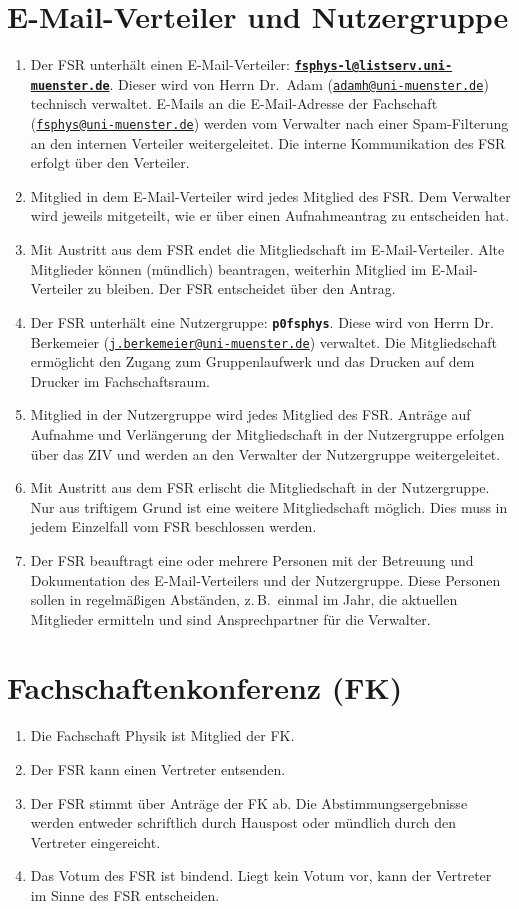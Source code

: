 \documentclass[
	a4paper,
	12pt,
	oneside,
	parskip=half-,
	pagesize,
	headsepline,
	german,
	ngerman
]{scrartcl}
\newcommand{\email}[1]{\href{mailto:#1}{\texttt{#1}}}
\begin{document}
\section{E-Mail-Verteiler und Nutzergruppe}
\label{sec:Technik}
 \begin{enumerate}
  \item Der FSR unterhält einen E-Mail-Verteiler: \textbf{\email{fsphys-l@listserv.uni-muenster.de}}. Dieser wird von Herrn Dr.\ Adam (\email{adamh@uni-muenster.de}) technisch verwaltet. E-Mails an die E-Mail-Adresse der Fachschaft (\email{fsphys@uni-muenster.de}) werden vom Verwalter nach einer Spam-Filterung an den internen Verteiler weitergeleitet. Die interne Kommunikation des FSR erfolgt über den Verteiler.
  \item Mitglied in dem E-Mail-Verteiler wird jedes Mitglied des FSR. Dem Verwalter wird jeweils mitgeteilt, wie er über einen Aufnahmeantrag zu entscheiden hat.
  \item Mit Austritt aus dem FSR endet die Mitgliedschaft im E-Mail-Verteiler. Alte Mitglieder können (mündlich) beantragen, weiterhin Mitglied im E-Mail-Verteiler zu bleiben. Der FSR entscheidet über den Antrag.
  \item Der FSR unterhält eine Nutzergruppe: \textbf{\texttt{p0fsphys}}. Diese wird von Herrn Dr. Berkemeier (\email{j.berkemeier@uni-muenster.de}) verwaltet. Die Mitgliedschaft ermöglicht den Zugang zum Gruppenlaufwerk und das Drucken auf dem Drucker im Fachschaftsraum.
  \item Mitglied in der Nutzergruppe wird jedes Mitglied des FSR. Anträge auf Aufnahme und Verlängerung der Mitgliedschaft in der Nutzergruppe erfolgen über das ZIV und werden an den Verwalter der Nutzergruppe weitergeleitet.
  \item Mit Austritt aus dem FSR erlischt die Mitgliedschaft in der Nutzergruppe. Nur aus triftigem Grund ist eine weitere Mitgliedschaft möglich. Dies muss in jedem Einzelfall vom FSR beschlossen werden.
  \item Der FSR beauftragt eine oder mehrere Personen mit der Betreuung und Dokumentation des E-Mail-Verteilers und der Nutzergruppe. Diese Personen sollen in regelmäßigen Abständen, z.\,B.\ einmal im Jahr, die aktuellen Mitglieder ermitteln und sind Ansprechpartner für die Verwalter.
  \label{item:Ansprechpartner}
 \end{enumerate}

\section{Fachschaftenkonferenz (FK)}
 \begin{enumerate}
  \item Die Fachschaft Physik ist Mitglied der FK.
  \item Der FSR kann einen Vertreter entsenden.
  \item Der FSR stimmt über Anträge der FK ab. Die Abstimmungsergebnisse werden entweder schriftlich durch Hauspost oder mündlich durch den Vertreter eingereicht.
  \item Das Votum des FSR ist bindend. Liegt kein Votum vor, kann der Vertreter im Sinne des FSR entscheiden.
 \end{enumerate}
\end{document}
